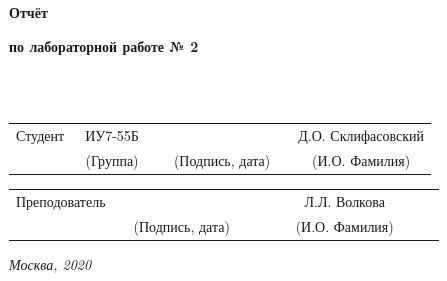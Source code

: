 \documentclass[12pt]{report}
\begin{document}
\begin{titlepage}
		
		\begin{center}
			\vspace{3cm}
			{\bf\huge Отчёт\par}
			{\bf\Large по лабораторной работе № 2\par}
			\vspace{0.5cm}
		\end{center}
		
		
		\noindent
		\\
		
		\noindent
		\\
		
		\vspace{1.5cm}
		\noindent
		\begin{tabular}{l c c c c c}
			Студент      & ~ИУ7-55Б~               & \hspace{3.5cm} & \hspace{3.5cm}                 & &  Д.О. Склифасовский \\\cline{2-2}\cline{4-4} \cline{6-6} 
			\hspace{3cm} & {\footnotesize(Группа)} &                & {\footnotesize(Подпись, дата)} & & {\footnotesize(И.О. Фамилия)}
		\end{tabular}
		
		\vspace{1cm}
		
		\noindent
		\begin{tabular}{l c c c c}
			Преподователь & \hspace{6cm}   & \hspace{3.5cm}                 & & ~~~~~~ Л.Л. Волкова ~~~~~~\\\cline{3-3} \cline{5-5} 
			\hspace{3cm}  &                & {\footnotesize(Подпись, дата)} & & {\footnotesize(И.О. Фамилия)}
		\end{tabular}
		
		\begin{center}	
			\vfill
			\large \textit {Москва, 2020}
		\end{center}
		
		\thispagestyle {empty}
		\pagebreak
	\end{titlepage}
	\restoregeometry
	
	\tableofcontents
	\onehalfspacing
	\newpage
\end{document}
